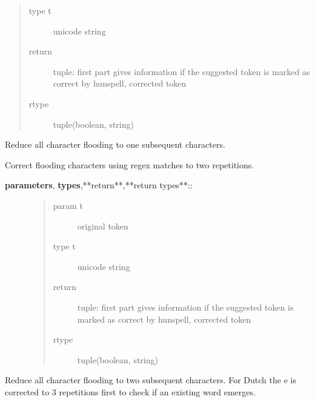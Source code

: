 \documentclass[letterpaper,10pt,english]{sphinxmanual}
\begin{document}
\begin{fulllineitems}
\begin{fulllineitems}
\begin{description}
\begin{quote}
\begin{description}
\item[{type t}] \leavevmode
unicode string

\item[{return}] \leavevmode
tuple: first part gives information if the suggested token is marked as correct by hunspell, corrected token

\item[{rtype}] \leavevmode
tuple(boolean, string)

\end{description}\end{quote}

\end{description}

Reduce all character flooding to one subsequent characters.

\end{fulllineitems}


\begin{fulllineitems}
\label{API:norm.modules.flooding.Flooding.correct_flooding_to_two}
Correct flooding characters using regex matches to two repetitions.
\begin{description}
\item[{\textbf{parameters}, \textbf{types},**return**,**return types**::}] \leavevmode\begin{quote}\begin{description}
\item[{param t}] \leavevmode
original token

\item[{type t}] \leavevmode
unicode string

\item[{return}] \leavevmode
tuple: first part gives information if the suggested token is marked as correct by hunspell, corrected token

\item[{rtype}] \leavevmode
tuple(boolean, string)

\end{description}\end{quote}

\end{description}

Reduce all character flooding to two subsequent characters. For Dutch the e is 
corrected to 3 repetitions first to check if an existing word emerges.


\end{fulllineitems}
\end{fulllineitems}
\end{document}
